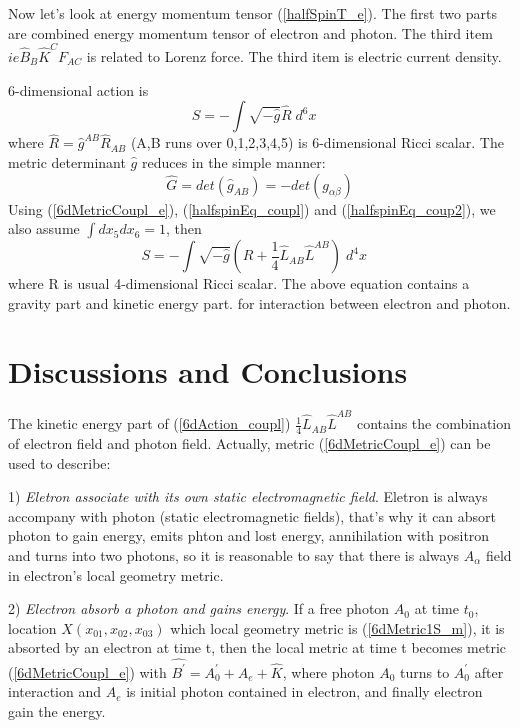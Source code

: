 \documentclass[twocolumn,showpacs,preprintnumbers,amsmath,amssymb]{revtex4}
\begin{document}
Now let's look at energy momentum tensor (\ref{halfSpinT_e}). The first two parts are combined energy momentum tensor of electron
and photon. The third item $ie\hat{B}_{B}\hat{K}^C F_{AC}$ is related to Lorenz force. The third item is electric current density.

6-dimensional action  is
\begin{equation}
S = -\int \sqrt{-\hat{g}} \hat{R}  
     \; d^6 x \; \; \; 
\label{6dAction}
\end{equation}
where $\hat{R} = \hat{g}^{AB} \hat{R}_{AB} $ (A,B runs over 0,1,2,3,4,5)
is 6-dimensional Ricci scalar. The metric determinant $\hat{g}$ reduces in the simple manner:
\begin{equation}
\hat{G} = det(\hat{g}_{AB}) = - det(g_{\alpha\beta})
\label{metric_det}
\end{equation}
Using (\ref{6dMetricCoupl_e}), (\ref{halfspinEq_coupl}) and (\ref{halfspinEq_coup2}),
we also assume $\int dx_5 dx_6 = 1 $, then
\begin{equation}
S = -\int \sqrt{-\hat{g}}( R + \frac{1}{4} \hat{L}_{AB} \hat{L}^{AB} )
     \; d^4 x \; \; \; 
\label{6dAction_coupl}
\end{equation}
where R is usual 4-dimensional Ricci scalar. The above equation contains a gravity part and kinetic energy part.
for interaction between electron and photon. 

\section{Discussions and Conclusions} \label{SUM}

The kinetic energy part of (\ref{6dAction_coupl}) $\frac{1}{4} \hat{L}_{AB} \hat{L}^{AB}$ 
contains the combination of electron field and 
photon field. Actually, metric (\ref{6dMetricCoupl_e}) can be used to describe: 

1) {\it Eletron associate with its own static electromagnetic field}. Eletron is always accompany with photon (static
electromagnetic fields), that's why it can absort photon to gain energy, emits phton and lost energy, annihilation with
positron and turns into two photons, so it is reasonable to say that there is 
always $A_{\alpha}$ field in electron's local geometry metric.

2) {\it Electron absorb a photon and gains energy}. If a free photon $A_0$ at time $t_0$, location $X(x_{01},x_{02},x_{03})$ which
local geometry metric is (\ref{6dMetric1S_m}), it is absorted by an electron at time t, then the local metric at time t becomes
metric (\ref{6dMetricCoupl_e}) with $\hat{B^{\prime}} = A^{\prime}_0 + A_{e} + \hat{K}$, where photon $A_0$ turns to $A^{\prime}_0$ after 
interaction and $A_{e}$ is initial photon contained in electron, and finally electron gain the energy.
\end{document}
